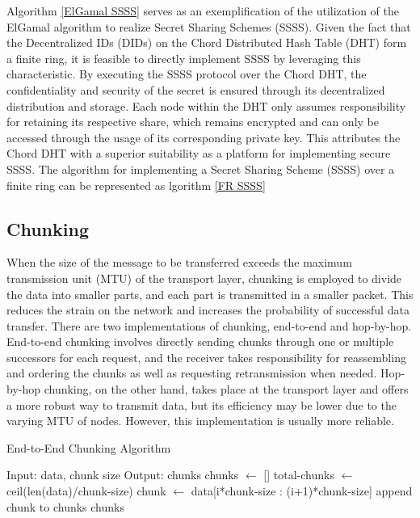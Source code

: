 \documentclass[twocolumn]{article}
\begin{document}
 Algorithm \ref{ElGamal SSSS} serves as an exemplification of the utilization of the ElGamal algorithm to realize Secret Sharing Schemes (SSSS). Given the fact that the Decentralized IDs (DIDs) on the Chord Distributed Hash Table (DHT) form a finite ring, it is feasible to directly implement SSSS by leveraging this characteristic. By executing the SSSS protocol over the Chord DHT, the confidentiality and security of the secret is ensured through its decentralized distribution and storage. Each node within the DHT only assumes responsibility for retaining its respective share, which remains encrypted and can only be accessed through the usage of its corresponding private key. This attributes the Chord DHT with a superior suitability as a platform for implementing secure SSSS. The algorithm for implementing a Secret Sharing Scheme (SSSS) over a finite ring can be represented as lgorithm \ref{FR SSSS}

 \subsection{Chunking}

 When the size of the message to be transferred exceeds the maximum transmission unit (MTU) of the transport layer, chunking is employed to divide the data into smaller parts, and each part is transmitted in a smaller packet. This reduces the strain on the network and increases the probability of successful data transfer. There are two implementations of chunking, end-to-end and hop-by-hop. End-to-end chunking involves directly sending chunks through one or multiple successors for each request, and the receiver takes responsibility for reassembling and ordering the chunks as well as requesting retransmission when needed. Hop-by-hop chunking, on the other hand, takes place at the transport layer and offers a more robust way to transmit data, but its efficiency may be lower due to the varying MTU of nodes. However, this implementation is usually more reliable.

 \begin{algorithm}[h]
\caption{End-to-End Chunking Algorithm}
\label{alg:e2e_chunking}
\begin{algorithmic}[1]
\State Input: data, chunk size
\State Output: chunks
\State chunks $\gets$ []
\State total-chunks $\gets$ ceil(len(data)/chunk-size)
\State chunk $\gets$ data[i*chunk-size : (i+1)*chunk-size]
\State append chunk to chunks
\EndFor
\State \Return chunks
\EndProcedure
\end{algorithmic}
\end{algorithm}
\end{document}
